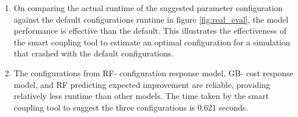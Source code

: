 \begin{enumerate}
\item On comparing the actual runtime of the suggested parameter configuration against the default configurations runtime in figure \ref{fig:real_eval}, the model performance is effective than the default. This illustrates the effectiveness of the smart coupling tool to estimate an optimal configuration for a simulation that crashed with the default configurations.

\item The configurations from RF- configuration response model, GB- cost response model, and RF predicting expected improvement are reliable, providing relatively less runtime than other models. The time taken by the smart coupling tool to suggest the three configurations is 0.621 seconds. 

\end{enumerate}

